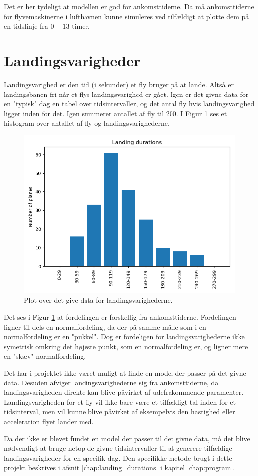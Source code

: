 Det er her tydeligt at modellen er god for ankomsttiderne. Da må ankomsttiderne for flyvemaskinerne i lufthavnen kunne simuleres ved tilfældigt at plotte dem på en tidslinje fra $0 - 13$ timer.

\section{Landingsvarigheder}
Landingsvarighed er den tid (i sekunder) et fly bruger på at lande.
Altså er landingsbanen fri når et flys landingsvarighed er gået.
Igen er det givne data for en "typisk" dag en tabel over tidsintervaller, og det antal fly hvis landingsvarighed ligger inden for det. Igen summerer antallet af fly til 200. I Figur \ref{fig:given_landing_durations_plot} ses et histogram over antallet af fly og landingsvarighederne.

\begin{figure}[h!]
	\centering
	\includegraphics[scale=0.6]{fig/img/given_landing_durations_plot.png}
	\caption{Plot over det give data for landingsvarighederne.} \label{fig:given_landing_durations_plot}
\end{figure}

Det ses i Figur \ref{fig:given_landing_durations_plot} at fordelingen er forskellig fra ankomsttiderne.
Fordelingen ligner til dels en normalfordeling, da der på samme måde som i en normalfordeling er en "pukkel".
Dog er fordeligen for landingsvarighederne ikke symetrisk omkring det højeste punkt, som en normalfordeling er, og ligner mere en "skæv" normalfordeling.

Det har i projektet ikke været muligt at finde en model der passer på det givne data.
Desuden afviger landingsvarighederne sig fra ankomsttiderne, da landingsvarigheden direkte kan blive påvirket af udefrakommende paramenter.
Landingsvarigheden for et fly vil ikke bare være et tilfældigt tal inden for et tidsinterval, men vil kunne blive påvirket af eksempelvis den hastighed eller acceleration flyet lander med. 

Da der ikke er blevet fundet en model der passer til det givne data, må det blive nødvendigt at bruge netop de givne tidsintervaller til at generere tilfældige landingsvarigheder for en specifik dag. Den specifikke metode brugt i dette projekt beskrives i afsnit \ref{chap:landing_durations} i kapitel \ref{chap:program}.
